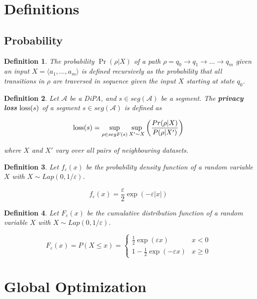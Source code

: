 \documentclass{article}
\newtheorem{definition}{Definition}[section]
\renewcommand{\epsilon}{\varepsilon}
\newcommand{\loss}{\textup{loss}}
\begin{document}
\tableofcontents

\section{Definitions}

\subsection{Probability}

\begin{definition}
    The probability $\Pr(\rho | X)$ of a path $\rho = q_0 \to q_1 \to \dots \to q_m$ given an input $X = \langle a_1 , \dots, a_m \rangle$ is defined recursively as the probability that all transitions in $\rho$ are traversed in sequence given the input $X$ starting at state $q_0$.
\end{definition}

\begin{definition}
    Let $\mathcal{A}$ be a DiPA, and $s \in seg(\mathcal{A})$ be a segment. The \textbf{privacy loss} $\loss(s)$ of a segment $s \in seg(\mathcal{A})$ is defined as 

    \[\loss(s) = \sup_{\rho \in segF(s)}\sup_{X' \sim X} \left(\frac{Pr(\rho | X)}{P(\rho | X')} \right) \]

    where $X$ and $X'$ vary over all pairs of neighbouring datasets. 
\end{definition}

\begin{definition}
    Let $f_\epsilon(x)$ be the probability density function of a random variable $X$ with $X \sim Lap(0, 1/\epsilon)$. 

    \[f_\epsilon(x) = \frac{\epsilon}{2} \exp(-\epsilon |x|)\]
\end{definition}

\begin{definition}
    Let $F_\epsilon(x)$ be the cumulative distribution function of a random variable $X$ with $X \sim Lap(0, 1/\epsilon)$.

    \[F_\epsilon(x) = P(X \leq x) = \begin{cases}
        \frac{1}{2} \exp(\epsilon x) & x < 0 \\
        1 - \frac{1}{2} \exp(-\epsilon x) & x \geq 0
    \end{cases}\]
\end{definition}

\newpage
\section{Global Optimization}
\end{document}
